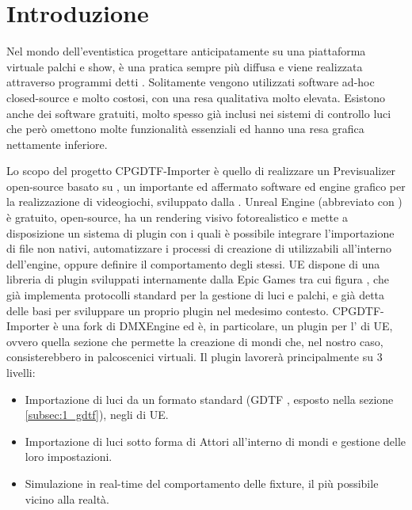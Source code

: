 \documentclass[main.tex]{subfiles}
\begin{document}
\sloppy


\vspace{1.0cm}

\section{Introduzione}\label{sec:Intro}
Nel mondo dell'eventistica progettare anticipatamente su una piattaforma virtuale palchi e show, è una pratica sempre più diffusa e viene realizzata attraverso programmi detti . Solitamente vengono utilizzati software\cite{capture} ad-hoc closed-source e molto costosi, con una resa qualitativa molto elevata. Esistono anche dei software gratuiti, molto spesso già inclusi nei sistemi di controllo luci che però omettono molte funzionalità essenziali ed hanno una resa grafica nettamente inferiore.\newline

Lo scopo del progetto CPGDTF-Importer è quello di realizzare un Previsualizer open-source basato su \cite{UnrealEngine}, un importante ed affermato software ed engine grafico per la realizzazione di videogiochi, sviluppato dalla . Unreal Engine (abbreviato con ) è gratuito, open-source, ha un rendering visivo fotorealistico e mette a disposizione un sistema di plugin con i quali è possibile integrare l'importazione di file non nativi, automatizzare i processi di creazione di  utilizzabili all'interno dell'engine, oppure definire il comportamento degli stessi. UE dispone di una libreria di plugin sviluppati internamente dalla Epic Games tra cui figura , che già implementa protocolli standard per la gestione di luci e palchi, e già detta delle basi per sviluppare un proprio plugin nel medesimo contesto.  
\newline
CPGDTF-Importer è una fork di DMXEngine ed è, in particolare, un plugin per l' di UE, ovvero quella sezione che permette la creazione di mondi che, nel nostro caso, consisterebbero in palcoscenici virtuali. Il plugin lavorerà principalmente su 3 livelli:
\begin{itemize}
    \item Importazione di luci da un formato standard (GDTF \cite{GDTF}, esposto nella sezione \ref{subsec:1_gdtf}), negli  di UE.
    \item Importazione di luci sotto forma di Attori all'interno di mondi e gestione delle loro impostazioni.
    \item Simulazione in real-time del comportamento delle fixture, il più possibile vicino alla realtà.
\end{itemize}
\end{document}
